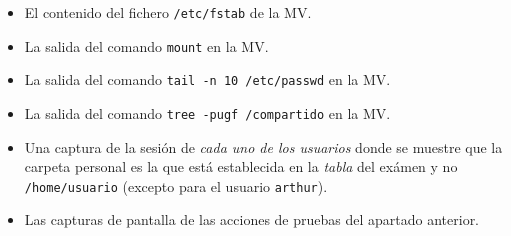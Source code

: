 \documentclass[11pt]{article}
\begin{document}
\begin{itemize}
\item El contenido del fichero \texttt{/etc/fstab} de la MV.
\item La salida del comando \texttt{mount} en la MV.
\item La salida del comando \texttt{tail -n 10 /etc/passwd} en la MV.
\item La salida del comando \texttt{tree -pugf /compartido} en la MV.
\item Una captura de la sesión de \emph{cada uno de los usuarios} donde se muestre que
la carpeta personal es la que está establecida en la \emph{tabla} del exámen y no
\texttt{/home/usuario} (excepto para el usuario \texttt{arthur}).
\item Las capturas de pantalla de las acciones de pruebas del apartado anterior.
\end{itemize}
\end{document}
